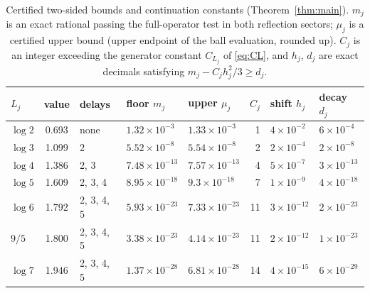 \begin{table}[ht]
\centering
\caption{Certified two-sided bounds and continuation constants (Theorem~\ref{thm:main}). $m_j$ is an exact rational passing the full-operator test in both reflection sectors; $\mu_j$ is a certified upper bound (upper endpoint of the ball evaluation, rounded up). $C_j$ is an integer exceeding the generator constant $C_{L_j}$ of \eqref{eq:CL}, and $h_j$, $d_j$ are exact decimals satisfying $m_j-C_jh_j^2/3\ge d_j$.}
\label{tab:main}
\small\setlength{\tabcolsep}{4pt}\begin{tabular}{@{}lclllrll@{}}
\toprule
$L_j$ & value & delays & floor $m_j$ & upper $\mu_j$ & $C_j$ & shift $h_j$ & decay $d_j$\\
\midrule
$\log2$ & 0.693 & none & $1.32\times10^{-3}$ & $1.33\times10^{-3}$ & 1 & $4\times10^{-2}$ & $6\times10^{-4}$\\
$\log3$ & 1.099 & 2 & $5.52\times10^{-8}$ & $5.54\times10^{-8}$ & 2 & $2\times10^{-4}$ & $2\times10^{-8}$\\
$\log4$ & 1.386 & 2, 3 & $7.48\times10^{-13}$ & $7.57\times10^{-13}$ & 4 & $5\times10^{-7}$ & $3\times10^{-13}$\\
$\log5$ & 1.609 & 2, 3, 4 & $8.95\times10^{-18}$ & $9.3\times10^{-18}$ & 7 & $1\times10^{-9}$ & $4\times10^{-18}$\\
$\log6$ & 1.792 & 2, 3, 4, 5 & $5.93\times10^{-23}$ & $7.33\times10^{-23}$ & 11 & $3\times10^{-12}$ & $2\times10^{-23}$\\
$9/5$ & 1.800 & 2, 3, 4, 5 & $3.38\times10^{-23}$ & $4.14\times10^{-23}$ & 11 & $2\times10^{-12}$ & $1\times10^{-23}$\\
$\log7$ & 1.946 & 2, 3, 4, 5 & $1.37\times10^{-28}$ & $6.81\times10^{-28}$ & 14 & $4\times10^{-15}$ & $6\times10^{-29}$\\
\bottomrule
\end{tabular}
\end{table}
